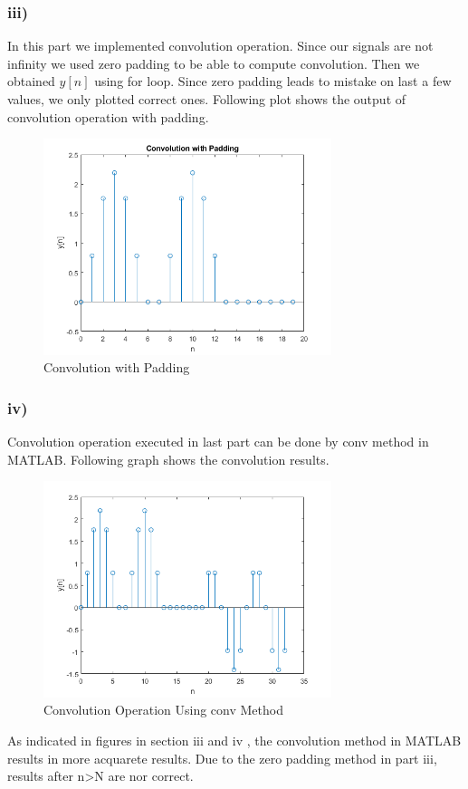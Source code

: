 \documentclass[letterpaper,12pt]{article}
\begin{document}
\subsubsection{iii)}
In this part we implemented convolution operation. Since our signals are not infinity we used zero padding to be able to compute convolution. Then we obtained \(y[n]\) using for loop. Since zero padding leads to mistake on last a few values, we only plotted correct ones. Following plot shows the output of convolution operation with padding.
\begin{figure}[H]
    \centering
    \includegraphics[width = 0.75\textwidth]{convwithpadding.png}
    \caption{Convolution with Padding}
    \end{figure} 
    
\subsubsection{iv)}
Convolution operation executed in last part can be done by conv method in MATLAB. Following graph shows the convolution results. 
\begin{figure}[H]
    \centering
    \includegraphics[width = 0.75\textwidth]{i4.png}
    \caption{Convolution Operation Using conv Method}
    \end{figure} 
    As indicated in figures in section iii and iv , the convolution method in MATLAB results in more acquarete results. Due to the zero padding method in part iii, results after n>N are nor correct.
\end{document}
